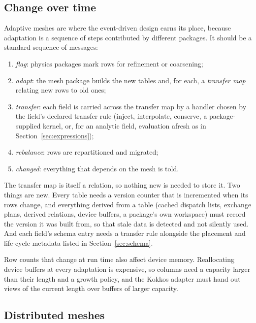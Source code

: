 \documentclass[11pt,a4paper]{article}
\begin{document}
\subsection{Change over time}
\label{sec:mesh-change}

Adaptive meshes are where the event-driven design earns its place, because
adaptation is a sequence of steps contributed by different packages.  It
should be a standard sequence of messages:

\begin{enumerate}
  \item \emph{flag}: physics packages mark rows for refinement or coarsening;
  \item \emph{adapt}: the mesh package builds the new tables and, for each, a
        \emph{transfer map} relating new rows to old ones;
  \item \emph{transfer}: each field is carried across the transfer map by a
        handler chosen by the field's declared transfer rule (inject,
        interpolate, conserve, a package-supplied kernel, or, for an
        analytic field, evaluation afresh as in
        Section~\ref{sec:expressions});
  \item \emph{rebalance}: rows are repartitioned and migrated;
  \item \emph{changed}: everything that depends on the mesh is told.
\end{enumerate}

The transfer map is itself a relation, so nothing new is needed to store it.
Two things are new.  Every table needs a version counter that is incremented
when its rows change, and everything derived from a table (cached dispatch
lists, exchange plans, derived relations, device buffers, a package's own
workspace) must record the version it was built from, so that stale data is
detected and not silently used.  And each field's schema entry needs a
transfer rule alongside the placement and life-cycle metadata listed in
Section~\ref{sec:schema}.

Row counts that change at run time also affect device memory.  Reallocating
device buffers at every adaptation is expensive, so columns need a capacity
larger than their length and a growth policy, and the Kokkos adapter must hand
out views of the current length over buffers of larger capacity.

\subsection{Distributed meshes}
\end{document}

